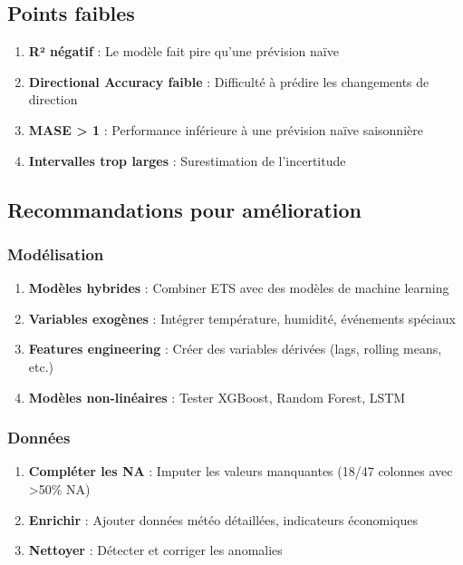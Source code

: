 \documentclass[12pt,a4paper]{article}
\begin{document}
\subsection{Points faibles}

\begin{enumerate}
    \item \textbf{R² négatif} : Le modèle fait pire qu'une prévision naïve
    \item \textbf{Directional Accuracy faible} : Difficulté à prédire les changements de direction
    \item \textbf{MASE > 1} : Performance inférieure à une prévision naïve saisonnière
    \item \textbf{Intervalles trop larges} : Surestimation de l'incertitude
\end{enumerate}

\subsection{Recommandations pour amélioration}

\subsubsection{Modélisation}

\begin{enumerate}
    \item \textbf{Modèles hybrides} : Combiner ETS avec des modèles de machine learning
    \item \textbf{Variables exogènes} : Intégrer température, humidité, événements spéciaux
    \item \textbf{Features engineering} : Créer des variables dérivées (lags, rolling means, etc.)
    \item \textbf{Modèles non-linéaires} : Tester XGBoost, Random Forest, LSTM
\end{enumerate}

\subsubsection{Données}

\begin{enumerate}
    \item \textbf{Compléter les NA} : Imputer les valeurs manquantes (18/47 colonnes avec >50\% NA)
    \item \textbf{Enrichir} : Ajouter données météo détaillées, indicateurs économiques
    \item \textbf{Nettoyer} : Détecter et corriger les anomalies
\end{enumerate}
\end{document}
